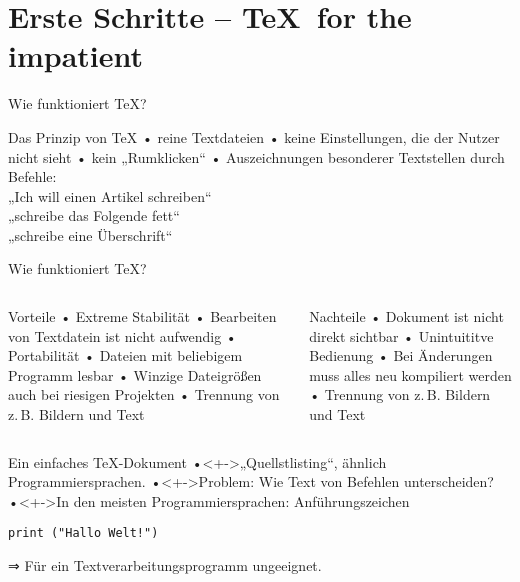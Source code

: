 \section[Erste Schritte]{Erste Schritte – \TeX\ for the impatient}
\begin{frame}[fragile]{Wie funktioniert \TeX?}
\begin{block}{Das Prinzip von \TeX}
• reine Textdateien
• keine Einstellungen, die der Nutzer nicht sieht
• kein „Rumklicken“
• Auszeichnungen besonderer Textstellen durch Befehle:\\%
  „Ich will einen Artikel schreiben“\\%
  „schreibe das Folgende fett“\\%
  „schreibe eine Überschrift“%
\•
\end{block}
\end{frame}

\begin{frame}{Wie funktioniert \TeX?}
\begin{columns}\begin{column}{.45\textwidth} 
\begin{block}{ Vorteile}
• Extreme Stabilität
• Bearbeiten von Textdatein ist nicht aufwendig
• Portabilität
• Dateien mit beliebigem Programm lesbar
• Winzige Dateigrößen auch bei riesigen Projekten
• Trennung von z.\,B. Bildern und Text
\• 
\end{block}
\end{column}
\begin{column}{.45\textwidth}
\begin{block}{ Nachteile}
• Dokument ist nicht direkt sichtbar
• Unintuititve Bedienung
• Bei Änderungen muss alles neu kompiliert werden
• Trennung von z.\,B. Bildern und Text
\•
\end{block}
\end{column}
\end{columns}
\end{frame}

\begin{frame}[fragile]{Ein einfaches \TeX-Dokument}
•<+->„Quellstlisting“, ähnlich Programmiersprachen.
•<+->Problem: Wie Text von Befehlen unterscheiden?
•<+->In den meisten Programmiersprachen: Anführungszeichen
\•
\pause
\begin{lstlisting}
print ("Hallo Welt!")
\end{lstlisting}
⇒ Für ein Textverarbeitungsprogramm ungeeignet.
\end{frame}

